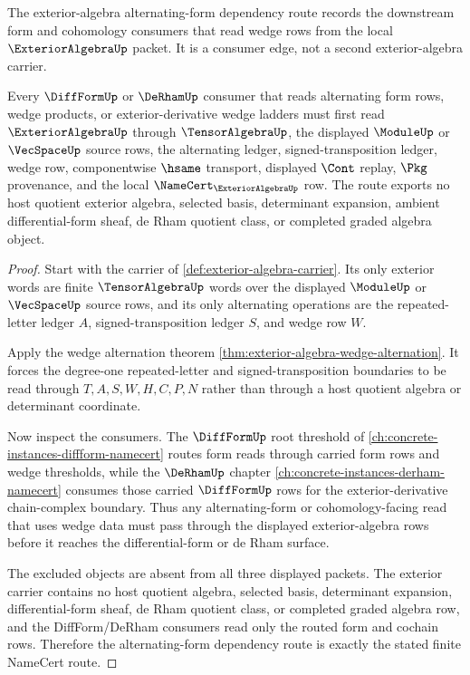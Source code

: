 The exterior-algebra alternating-form dependency route records the downstream form and cohomology consumers that read wedge rows from the local $\ExteriorAlgebraUp$ packet. It is a consumer edge, not a second exterior-algebra carrier.

\begin{theorem}
\label{thm:exterior-algebra-alternating-form-dependency-route}
Every $\DiffFormUp$ or $\DeRhamUp$ consumer that reads alternating form rows, wedge products, or exterior-derivative wedge ladders must first read $\ExteriorAlgebraUp$ through $\TensorAlgebraUp$, the displayed $\ModuleUp$ or $\VecSpaceUp$ source rows, the alternating ledger, signed-transposition ledger, wedge row, componentwise $\hsame$ transport, displayed $\Cont$ replay, $\Pkg$ provenance, and the local $\NameCert_{\ExteriorAlgebraUp}$ row. The route exports no host quotient exterior algebra, selected basis, determinant expansion, ambient differential-form sheaf, de Rham quotient class, or completed graded algebra object.
\end{theorem}
\begin{proof}
Start with the carrier of \autoref{def:exterior-algebra-carrier}. Its only exterior words are finite $\TensorAlgebraUp$ words over the displayed $\ModuleUp$ or $\VecSpaceUp$ source rows, and its only alternating operations are the repeated-letter ledger $A$, signed-transposition ledger $S$, and wedge row $W$.

Apply the wedge alternation theorem \autoref{thm:exterior-algebra-wedge-alternation}. It forces the degree-one repeated-letter and signed-transposition boundaries to be read through $T,A,S,W,H,C,P,N$ rather than through a host quotient algebra or determinant coordinate.

Now inspect the consumers. The $\DiffFormUp$ root threshold of \autoref{ch:concrete-instances-diffform-namecert} routes form reads through carried form rows and wedge thresholds, while the $\DeRhamUp$ chapter \autoref{ch:concrete-instances-derham-namecert} consumes those carried $\DiffFormUp$ rows for the exterior-derivative chain-complex boundary. Thus any alternating-form or cohomology-facing read that uses wedge data must pass through the displayed exterior-algebra rows before it reaches the differential-form or de Rham surface.

The excluded objects are absent from all three displayed packets. The exterior carrier contains no host quotient algebra, selected basis, determinant expansion, differential-form sheaf, de Rham quotient class, or completed graded algebra row, and the DiffForm/DeRham consumers read only the routed form and cochain rows. Therefore the alternating-form dependency route is exactly the stated finite NameCert route.
\end{proof}
